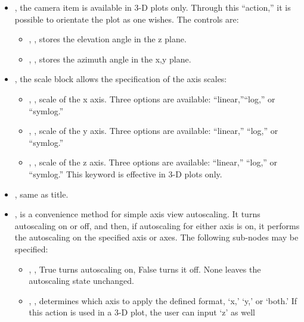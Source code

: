 \begin{itemize}
  \item {}, the camera item is available in 3-D plots only.
  Through this ``action,'' it is possible to orientate the plot as one wishes.
  The controls are:
  \begin{itemize}
    \item {}, , stores the elevation
    angle in the z plane.
    \item {}, , stores the azimuth
    angle in the x,y plane.
  \end{itemize}
  \item {}, the scale block allows the specification of the axis
  scales:
  \begin{itemize}
    \item {}, , scale of the x axis.
    Three options are available: ``linear,''``log,'' or ``symlog.''
    \item {}, , scale of the y axis.
    Three options are available: ``linear,'' ``log,'' or ``symlog.''
    \item {}, , scale of the z axis.
    Three options are available: ``linear,'' ``log,'' or ``symlog.''
    \nb This keyword is effective in 3-D plots only.
  \end{itemize}
  \item {}, same as title.
  \item {}, is a convenience method for simple axis view
  autoscaling.
  It turns autoscaling on or off, and then, if autoscaling for either axis is
  on, it performs the autoscaling on the specified axis or axes.
  The following sub-nodes may be specified:
  \begin{itemize}
    \item {}, , True turns autoscaling
    on, False turns it off.
    None leaves the autoscaling state unchanged.
    \item {}, , determines which axis
    to apply the defined format, `x,' `y,' or `both.'
    \nb If this action is used in a 3-D plot, the user can input `z' as well

\end{itemize}
\end{itemize}
